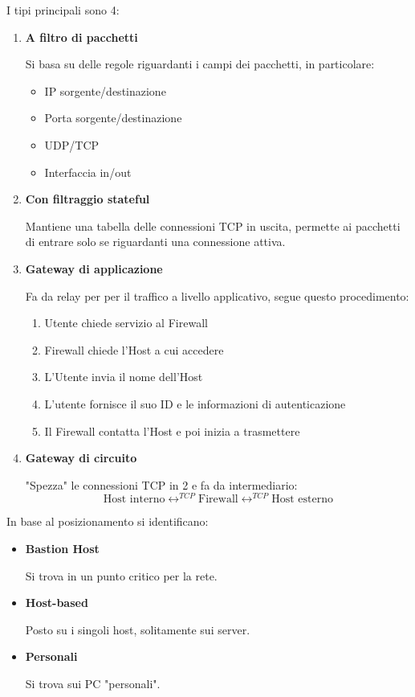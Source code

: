 \documentclass{article}
\begin{document}
\noindent I tipi principali sono 4:
\begin{enumerate}
    \item \textbf{A filtro di pacchetti}

        Si basa su delle regole riguardanti i campi dei pacchetti, in particolare:
        \begin{itemize}
            \item IP sorgente/destinazione
            \item Porta sorgente/destinazione
            \item UDP/TCP
            \item Interfaccia in/out
        \end{itemize}

    \item \textbf{Con filtraggio stateful}

        Mantiene una tabella delle connessioni TCP in uscita, permette ai pacchetti di entrare solo se riguardanti una connessione attiva.

    \item \textbf{Gateway di applicazione}

        Fa da relay per per il traffico a livello applicativo, segue questo procedimento:
            \begin{enumerate}
                \item Utente chiede servizio al Firewall
                \item Firewall chiede l'Host a cui accedere
                \item L'Utente invia il nome dell'Host
                \item L'utente fornisce il suo ID e le informazioni di autenticazione
                \item Il Firewall contatta l'Host e poi inizia a trasmettere
            \end{enumerate}

    \item \textbf{Gateway di circuito}

        "Spezza" le connessioni TCP in 2 e fa da intermediario: 
        $$\text{Host interno} \longleftrightarrow^{TCP} \text{Firewall} \longleftrightarrow^{TCP} \text{Host esterno}$$\newline
    
\end{enumerate}

\noindent In base al posizionamento si identificano:
\begin{itemize}
    \item \textbf{Bastion Host}

        Si trova in un punto critico per la rete.
    
    \item \textbf{Host-based}

        Posto su i singoli host, solitamente sui server.
    
    \item \textbf{Personali}

        Si trova sui PC "personali".

\end{itemize}
\end{document}
